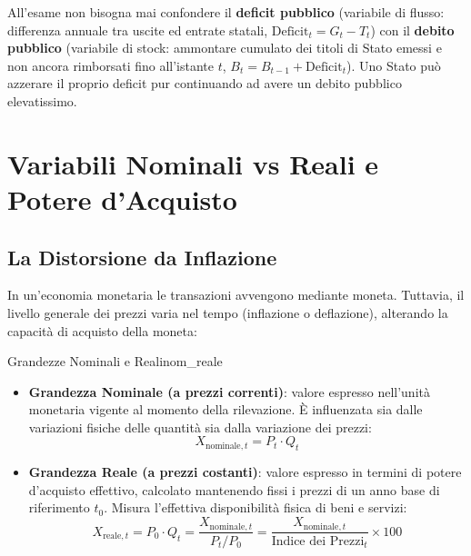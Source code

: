 \begin{esame}
All'esame non bisogna mai confondere il \textbf{deficit pubblico} (variabile di flusso: differenza annuale tra uscite ed entrate statali, $\text{Deficit}_t = G_t - T_t$) con il \textbf{debito pubblico} (variabile di stock: ammontare cumulato dei titoli di Stato emessi e non ancora rimborsati fino all'istante $t$, $B_t = B_{t-1} + \text{Deficit}_t$). Uno Stato può azzerare il proprio deficit pur continuando ad avere un debito pubblico elevatissimo.
\end{esame}

\section{Variabili Nominali vs Reali e Potere d'Acquisto}

\subsection{La Distorsione da Inflazione}
In un'economia monetaria le transazioni avvengono mediante moneta. Tuttavia, il livello generale dei prezzi varia nel tempo (inflazione o deflazione), alterando la capacità di acquisto della moneta:

\begin{definizione}{Grandezze Nominali e Reali}{nom_reale}
\begin{itemize}
    \item \textbf{Grandezza Nominale (a prezzi correnti)}: valore espresso nell'unità monetaria vigente al momento della rilevazione. È influenzata sia dalle variazioni fisiche delle quantità sia dalla variazione dei prezzi:
    \begin{equation}
        X_{\text{nominale}, t} = P_t \cdot Q_t
    \end{equation}
    \item \textbf{Grandezza Reale (a prezzi costanti)}: valore espresso in termini di potere d'acquisto effettivo, calcolato mantenendo fissi i prezzi di un anno base di riferimento $t_0$. Misura l'effettiva disponibilità fisica di beni e servizi:
    \begin{equation}
        X_{\text{reale}, t} = P_0 \cdot Q_t = \frac{X_{\text{nominale}, t}}{P_t / P_0} = \frac{X_{\text{nominale}, t}}{\text{Indice dei Prezzi}_t} \times 100
    \end{equation}
\end{itemize}
\end{definizione}

